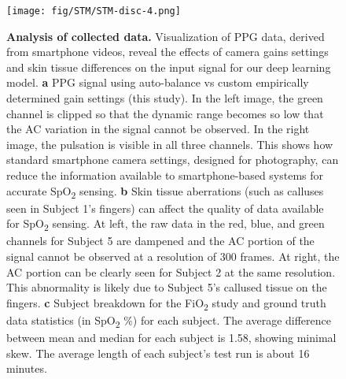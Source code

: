 \documentclass[12pt]{article}
\begin{document}
\begin{figure}
    \centering
    \texttt{[image: fig/STM/STM-disc-4.png]}
    \caption{\textbf{Analysis of collected data.} Visualization of PPG data, derived from smartphone videos, reveal the effects of camera gains settings and skin tissue differences on the input signal for our deep learning model. \textbf{a} PPG signal using auto-balance \cite{ding2018measuring} vs custom empirically determined gain settings (this study). 
    In the left image, the green channel is clipped so that the dynamic range becomes so low that the AC variation in the signal cannot be observed. In the right image, the pulsation is visible in all three channels. This shows how standard smartphone camera settings, designed for photography, can reduce the information available to smartphone-based systems for accurate SpO\textsubscript{2} sensing.
    \textbf{b} Skin tissue aberrations (such as calluses seen in Subject 1's fingers) can affect the quality of data available for SpO\textsubscript{2} sensing.  At left, the raw data in the red, blue, and green channels for Subject 5 are dampened and the AC portion of the signal cannot be observed at a resolution of 300 frames. At right, the AC portion can be clearly seen for Subject 2 at the same resolution.
    This abnormality is likely due to Subject 5's callused tissue on the fingers.
    \textbf{c} Subject breakdown for the FiO\textsubscript{2} study and ground truth data statistics (in SpO\textsubscript{2} \%) for each subject. The average difference between mean and median for each subject is 1.58, showing minimal skew. The average length of each subject's test run is about 16 minutes.}
    \label{RGB-ana}
\end{figure}
\end{document}
